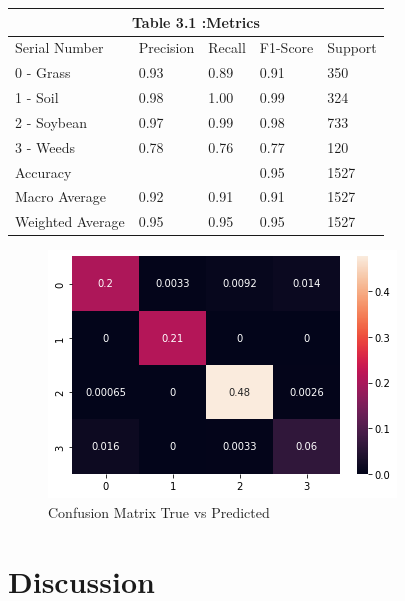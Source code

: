 \documentclass{report}
\begin{document}
\hfill

\begin{tabular}[H]{ | p{3cm}||p{2cm}||p{2cm}||p{2cm}||p{2cm}|}
\hline
 \multicolumn{5}{|c|}{ Table 3.1 :Metrics }\\
 \hline
 Serial Number & Precision & Recall & F1-Score & Support\\
 \hline
 0 - Grass & 0.93 & 0.89 & 0.91 & 350 \\
 1 - Soil & 0.98 & 1.00 & 0.99 & 324\\
 2 - Soybean & 0.97 & 0.99 & 0.98 & 733\\
 3 - Weeds & 0.78 & 0.76 & 0.77 & 120 \\
 Accuracy &  &  & 0.95 & 1527\\
 Macro Average & 0.92 & 0.91 & 0.91 & 1527\\
 Weighted Average & 0.95 & 0.95 & 0.95 & 1527\\
 \hline

\end{tabular}

\begin{figure}[H]
\centering
\includegraphics[width=\textwidth]{Confusion_matrix.png}
\caption{Confusion Matrix True vs Predicted}
\label{fig:CM}
\end{figure}



\section{Discussion}
\end{document}
